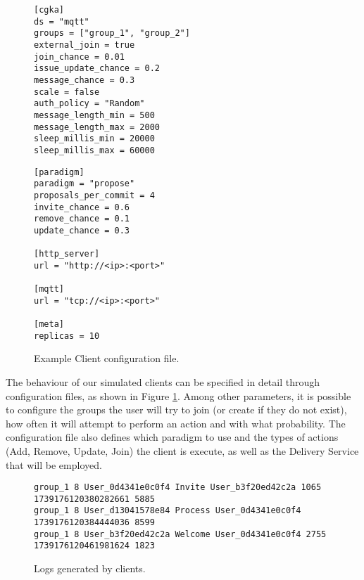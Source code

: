 \documentclass[preprint, 12pt]{elsarticle}
\begin{document}
\begin{figure}[!t]
\centering
\begin{tcolorbox}[colback=white, colframe=black, width=\linewidth]
\begin{multicols}{2}
\begin{lstlisting}
[cgka]
ds = "mqtt"
groups = ["group_1", "group_2"]
external_join = true
join_chance = 0.01
issue_update_chance = 0.2
message_chance = 0.3
scale = false
auth_policy = "Random"
message_length_min = 500
message_length_max = 2000
sleep_millis_min = 20000
sleep_millis_max = 60000
\end{lstlisting}

\columnbreak

\begin{lstlisting}
[paradigm]
paradigm = "propose"
proposals_per_commit = 4
invite_chance = 0.6
remove_chance = 0.1
update_chance = 0.3

[http_server]
url = "http://<ip>:<port>"

[mqtt]
url = "tcp://<ip>:<port>"

[meta]
replicas = 10
\end{lstlisting}
\end{multicols}
\end{tcolorbox}
\caption{Example Client configuration file.}
\label{lst:conf}
\end{figure}

The behaviour of our simulated clients can be specified in detail through configuration files, as shown in Figure \ref{lst:conf}. Among other parameters, it is possible to configure the groups the user will try to join (or create if they do not exist), how often it will attempt to perform an action and with what probability. The configuration file also defines which paradigm to use and the types of actions (Add, Remove, Update, Join) the client is execute, as well as the Delivery Service that will be employed.

\begin{figure}[!t]
\centering
\begin{tcolorbox}[colback=white, colframe=black, width=\linewidth]
\begin{lstlisting}
group_1 8 User_0d4341e0c0f4 Invite User_b3f20ed42c2a 1065 1739176120380282661 5885
group_1 8 User_d13041578e84 Process User_0d4341e0c0f4 1739176120384444036 8599
group_1 8 User_b3f20ed42c2a Welcome User_0d4341e0c0f4 2755 1739176120461981624 1823
\end{lstlisting}
\end{tcolorbox}
\caption{Logs generated by clients.}
\label{lst:log}
\end{figure}
\end{document}
